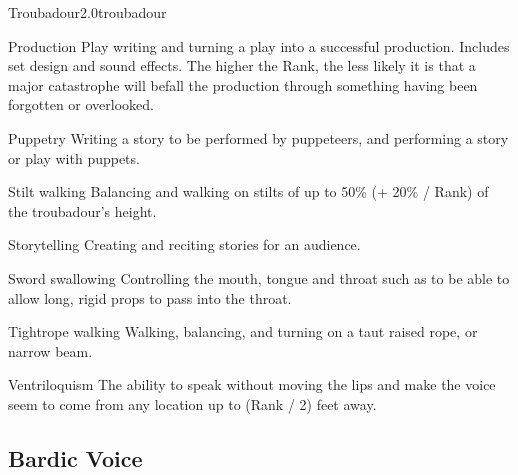 \begin{skill}{Troubadour}{2.0}{troubadour}
\begin{Description}
\item[Production]
Play writing and turning a play into a successful production. Includes
set design and sound effects.  The higher the Rank, the less likely it
is that a major catastrophe will befall the production through
something having been forgotten or overlooked.

\item[Puppetry]
Writing a story to be performed by puppeteers, and performing a story
or play with puppets.

\item[Stilt walking]
Balancing and walking on stilts of up to 50\% (+ 20\% / Rank) of the
troubadour's height.

\item[Storytelling]
Creating and reciting stories for an audience.

\item[Sword swallowing]
Controlling the mouth, tongue and throat such as to be able to allow
long, rigid props to pass into the throat.

\item[Tightrope walking]
Walking, balancing, and turning on a taut raised rope, or narrow beam.

\item[Ventriloquism]
The ability to speak without moving the lips and make the voice seem
to come from any location up to (Rank / 2) feet away.

\end{Description}

\subsection{Bardic Voice}


\end{skill}
